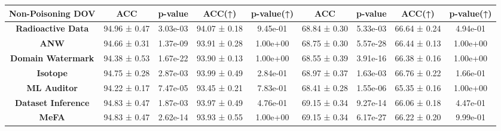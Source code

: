 \begin{table}[htb]
{\begin{tabular}{c|cccc|cccc}
    \rowcolor[rgb]{.906, .902, .902} \textbf{Non-Poisoning DOV} & ACC  & p-value & ACC(↑) & p-value(↑) & ACC   & p-value & ACC(↑) & p-value(↑) \\
    \midrule
    \textbf{Radioactive Data} & 94.96 ± 0.47 & \cellcolor{lightred} 3.03e-03 & 94.07 ± 0.18 & \cellcolor{lightgreen} 9.45e-01 & 68.84 ± 0.30 & \cellcolor{lightred} 5.33e-03 & 66.64 ± 0.24 &\cellcolor{lightgreen} 4.94e-01 \\
     \textbf{ANW} & 94.66 ± 0.31 & \cellcolor{lightred} 1.37e-09 & 93.91 ± 0.28 &\cellcolor{lightgreen} 1.00e+00 & 68.75 ± 0.30 & \cellcolor{lightred} 5.57e-28 & 66.44 ± 0.13 &\cellcolor{lightgreen} 1.00e+00 \\
    \textbf{Domain Watermark} & 94.38 ± 0.53 &\cellcolor{lightred} 1.67e-22 & 93.90 ± 0.13 &\cellcolor{lightgreen} 1.00e+00 & 68.55 ± 0.39 &\cellcolor{lightred} 3.91e-16 & 66.38 ± 0.16 &\cellcolor{lightgreen} 1.00e+00 \\
     \textbf{Isotope} & 94.75 ± 0.28 &\cellcolor{lightred} 2.87e-03 & 93.99 ± 0.49 &\cellcolor{lightgreen} 2.84e-01 & 68.97 ± 0.37 &\cellcolor{lightred} 1.63e-03 & 66.76 ± 0.22 &\cellcolor{lightgreen} 1.66e-01 \\
     \textbf{ML Auditor}& 94.22 ± 0.17& \cellcolor{lightred}7.47e-05&93.45 ±  0.21&\cellcolor{lightgreen}7.83e-01&68.41 ± 0.28&\cellcolor{lightred}1.55e-06&65.35 ± 0.16&\cellcolor{lightgreen}1.00e+00\\
    \textbf{Dataset Inference} & 94.83 ± 0.47 &\cellcolor{lightred} 1.87e-03 & 93.97 ± 0.49 &\cellcolor{lightgreen} 4.76e-01 & 69.15 ± 0.34 &\cellcolor{lightred} 9.27e-14 & 66.06 ± 0.18 &\cellcolor{lightgreen} 4.47e-01 \\
     \textbf{MeFA} & 94.83 ± 0.47 &\cellcolor{lightred} 2.62e-14 & 93.93 ± 0.55 &\cellcolor{lightgreen} 1.00e+00 & 69.15 ± 0.34 &\cellcolor{lightred} 6.17e-27 & 66.22 ± 0.20 &\cellcolor{lightgreen} 9.99e-01 \\
    \bottomrule[1.5pt]
    \end{tabular}
  }
  \label{tab:escaping_advanced}
\end{table}
